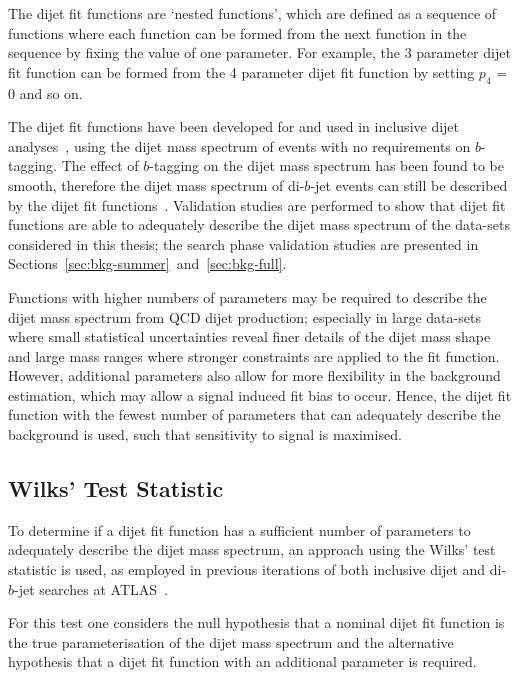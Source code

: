 The dijet fit functions are `nested functions',
which are defined as a sequence of functions where each function can be formed from the next function in the sequence by fixing the value of one parameter.
For example, the 3 parameter dijet fit function can be formed from the 4 parameter dijet fit function by setting $p_4$ = 0 and so on.

The dijet fit functions have been developed for and used in inclusive dijet analyses~\cite{theo-dijet_harris},
using the dijet mass spectrum of events with no requirements on $b$-tagging.
The effect of $b$-tagging on the dijet mass spectrum has been found to be smooth,
therefore the dijet mass spectrum of di-$b$-jet events can still be described by the dijet fit functions~\cite{dibjet-mori16_paper}.
Validation studies are performed to show that dijet fit functions are able
to adequately describe the dijet mass spectrum of the data-sets considered in this thesis;
the search phase validation studies are presented in Sections~\ref{sec:bkg-summer}~and~\ref{sec:bkg-full}.

Functions with higher numbers of parameters may be required to describe the dijet mass spectrum from QCD dijet production;
especially in large data-sets where small statistical uncertainties reveal finer details of the dijet mass shape
and large mass ranges where stronger constraints are applied to the fit function.
However, additional parameters also allow for more flexibility in the background estimation,
which may allow a signal induced fit bias to occur.
Hence, the dijet fit function with the fewest number of parameters
that can adequately describe the background is used, such that sensitivity to signal is maximised.

\subsection{Wilks' Test Statistic} 
\label{sec:bkg-wilks}

To determine if a dijet fit function has a sufficient number of parameters to adequately describe the dijet mass spectrum, an approach using the Wilks' test statistic is used,
as employed in previous iterations of both inclusive dijet and di-$b$-jet searches at ATLAS~\cite{dijet-mori16_paper,dibjet-mori16_paper}.

For this test one considers the null hypothesis that a nominal dijet fit function is the true parameterisation of the dijet mass spectrum
and the alternative hypothesis that a dijet fit function with an additional parameter is required.

